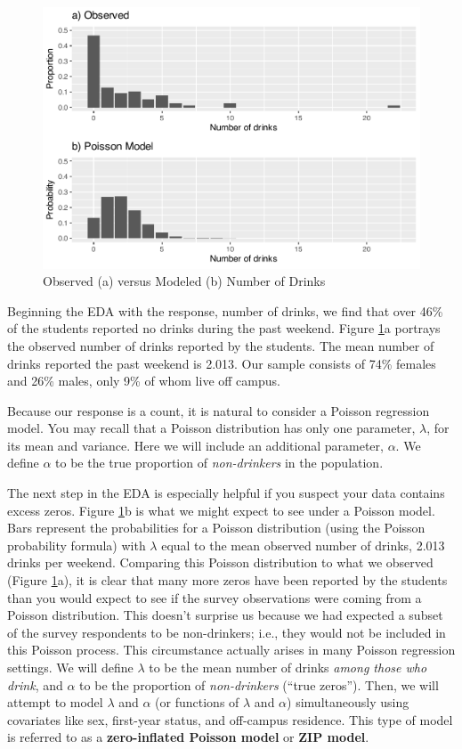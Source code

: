 \documentclass[
]{krantz}
\begin{document}
\begin{figure}

{\centering \includegraphics[width=0.6\linewidth]{bookdown-BeyondMLR_files/figure-latex/obsVmodel-1} 

}

\caption{Observed (a) versus Modeled (b) Number of Drinks}\label{fig:obsVmodel}
\end{figure}

Beginning the EDA with the response, number of drinks, we find that over 46\% of the students reported no drinks during the past weekend. Figure \ref{fig:obsVmodel}a portrays the observed number of drinks reported by the students. The mean number of drinks reported the past weekend is 2.013. Our sample consists of 74\% females and 26\% males, only 9\% of whom live off campus.

Because our response is a count, it is natural to consider a Poisson regression model. You may recall that a Poisson distribution has only one parameter, \(\lambda\), for its mean and variance. Here we will include an additional parameter, \(\alpha\). We define \(\alpha\) to be the true proportion of \emph{non-drinkers} in the population.

The next step in the EDA is especially helpful if you suspect your data contains excess zeros. Figure \ref{fig:obsVmodel}b is what we might expect to see under a Poisson model. Bars represent the probabilities for a Poisson distribution (using the Poisson probability formula) with \(\lambda\) equal to the mean observed number of drinks, 2.013 drinks per weekend. Comparing this Poisson distribution to what we observed (Figure \ref{fig:obsVmodel}a), it is clear that many more zeros have been reported by the students than you would expect to see if the survey observations were coming from a Poisson distribution. This doesn't surprise us because we had expected a subset of the survey respondents to be non-drinkers; i.e., they would not be included in this Poisson process. This circumstance actually arises in many Poisson regression settings. We will define \(\lambda\) to be the mean number of drinks \emph{among those who drink}, and \(\alpha\) to be the proportion of \emph{non-drinkers} (``true zeros''). Then, we will attempt to model \(\lambda\) and \(\alpha\) (or functions of \(\lambda\) and \(\alpha\)) simultaneously using covariates like sex, first-year status, and off-campus residence. This type of model is referred to as a \textbf{zero-inflated Poisson model} or \textbf{ZIP model}. 
\end{document}
